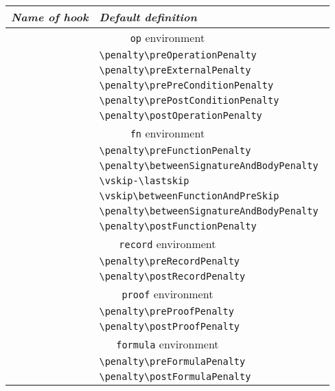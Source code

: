 \documentclass{article}
\renewcommand{\^}[1]{$\langle${\rm #1\/}$\rangle$}
\newcommand{\cs}[1]{\leavevmode\hbox{\tt \string#1}}
\begin{document}
\begin{center}\footnotesize
\begin{tabular}{|l|l|}
\hline
\em Name of hook & \em Default definition \\
\hline
\multicolumn{2}{|c|}{{\tt op} environment} \\
\hline
\cs\preOperationHook
        &\verb*;\penalty\preOperationPenalty ;\\
\cs\betweenHeaderAndExternalsHook
        &\verb*;\penalty\preExternalPenalty ;\\
\cs\betweenExternalsAndPreConditionHook
        &\verb*;\penalty\prePreConditionPenalty ;\\
\cs\betweenPreAndPostConditionHook
        &\verb*;\penalty\prePostConditionPenalty ;\\
\cs\postOperationHook
        &\verb*;\penalty\postOperationPenalty ;\\
\hline
\multicolumn{2}{|c|}{{\tt fn} environment} \\
\hline
\cs\preFunctionHook
                &\verb*;\penalty\preFunctionPenalty ;\\
\cs\betweenSignatureAndBodyHook
                &\verb*;\penalty\betweenSignatureAndBodyPenalty ; \\
\cs\betweenFunctionAndPreHook&\verb*;\vskip-\lastskip ;\\
                &\verb;\vskip\betweenFunctionAndPreSkip ;\\
                &\verb*;\penalty\betweenSignatureAndBodyPenalty ; \\
\cs\postFunctionHook
                &\verb*;\penalty\postFunctionPenalty ; \\
\hline
\multicolumn{2}{|c|}{{\tt record} environment} \\
\hline
\cs\preRecordHook
                &\verb*;\penalty\preRecordPenalty ;\\
\cs\postRecordHook
                &\verb*;\penalty\postRecordPenalty ; \\
\hline
\multicolumn{2}{|c|}{{\tt proof} environment} \\
\hline
\cs\preProofHook
                &\verb*;\penalty\preProofPenalty ;\\
\cs\postProofHook
                &\verb*;\penalty\postProofPenalty ; \\
\hline
\multicolumn{2}{|c|}{{\tt formula} environment} \\
\hline
\cs\preFormulaHook
                &\verb*;\penalty\preFormulaPenalty ;\\
\cs\postFormulaHook
                &\verb*;\penalty\postFormulaPenalty ; \\
\hline
\end{tabular}
\end{center}
\end{document}
